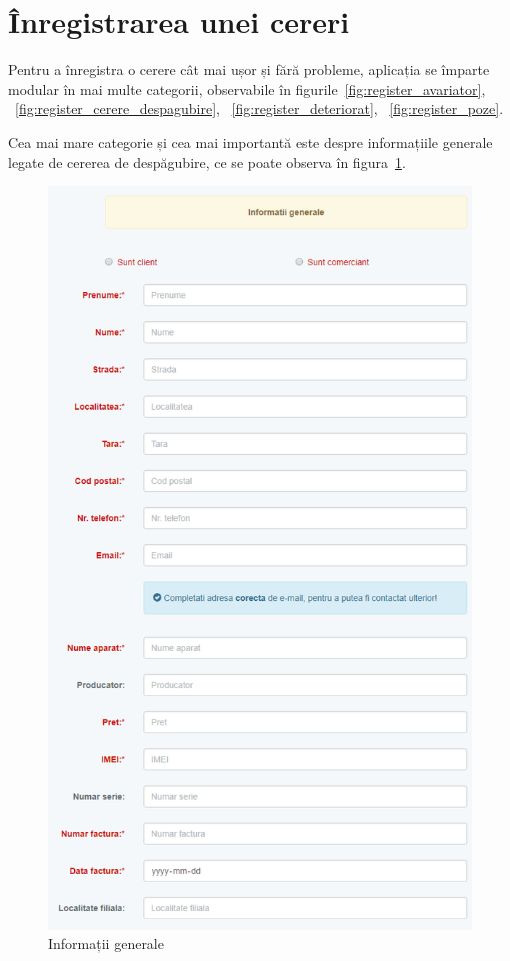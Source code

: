 \section{Înregistrarea unei cereri}

	Pentru a înregistra o cerere cât mai ușor și fără probleme, aplicația se împarte modular în mai multe categorii, observabile în figurile~\ref{fig:register_avariator}, ~\ref{fig:register_cerere_despagubire}, ~\ref{fig:register_deteriorat}, ~\ref{fig:register_poze}.

	Cea mai mare categorie și cea mai importantă este despre informațiile generale legate de cererea de despăgubire, ce se poate observa în figura~\ref{fig:register_informatii_generale}.

	\begin{figure}
		\centering
		\includegraphics[width=0.8\linewidth]{../imagini/register_informatii_generale.png}
		\caption{Informații generale}
		\label{fig:register_informatii_generale}
	\end{figure}

